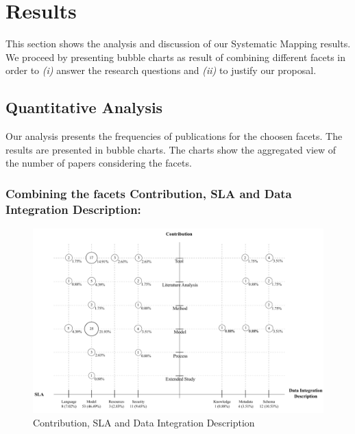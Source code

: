 \section{Results}\label{sec:qanalysis}

This section shows the analysis and discussion of our Systematic Mapping results.
We proceed by presenting bubble charts as result of combining different facets in order to 
\textit{(i)} answer the research questions and \textit{(ii)} to justify our proposal.


\subsection{Quantitative Analysis}


Our analysis presents the frequencies of publications for
the choosen facets. The results are presented in bubble charts. The
charts show the aggregated view of the number of papers  considering the facets. 


\subsubsection{Combining the facets Contribution, SLA and Data Integration
Description:}

\begin{figure}[h!]
\centering
\includegraphics[scale=0.56]{figs/bubble-charts/Contribution-SLA-DIdescription.pdf} 
\caption{Contribution, SLA and Data Integration Description}\label{fig:facet1}
\end{figure}

